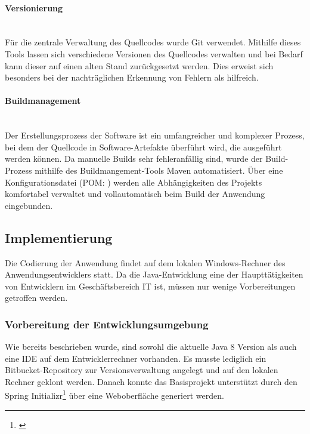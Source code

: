 \paragraph{Versionierung} ~\\
\label{p:Versionierung}
Für die zentrale Verwaltung des Quellcodes wurde Git verwendet. Mithilfe dieses Tools lassen sich verschiedene Versionen des Quellcodes verwalten und bei Bedarf kann dieser auf einen alten Stand zurückgesetzt werden. Dies erweist sich besonders bei der nachträglichen Erkennung von Fehlern als hilfreich.

\paragraph{Buildmanagement} ~\\
\label{p:Buildmangement}
Der Erstellungsprozess der Software ist ein umfangreicher und komplexer Prozess, bei dem der Quellcode in Software-Artefakte überführt wird, die ausgeführt werden können. Da manuelle Builds sehr fehleranfällig sind, wurde der Build-Prozess mithilfe des Buildmangement-Tools Maven automatisiert. Über eine Konfigurationsdatei (\acs{POM}: ) werden alle Abhängigkeiten des Projekts komfortabel verwaltet und vollautomatisch beim Build der Anwendung eingebunden.


\subsection{Implementierung} 
\label{sec:Implementierung}
Die Codierung der Anwendung findet auf dem lokalen Windows-Rechner des Anwendungsentwicklers statt. Da die Java-Entwicklung eine der Haupttätigkeiten von Entwicklern im Geschäftsbereich IT ist, müssen nur wenige Vorbereitungen getroffen werden.

\subsubsection{Vorbereitung der Entwicklungsumgebung}
\label{sec:Entwicklungsumgebung}
Wie bereits beschrieben wurde, sind sowohl die aktuelle Java 8 Version als auch eine \ac{IDE} auf dem Entwicklerrechner vorhanden. Es musste lediglich ein Bitbucket-Repository zur Versionsverwaltung angelegt und auf den lokalen Rechner geklont werden. Danach konnte das Basisprojekt unterstützt durch den Spring Initializr\footnote{\cite{spring:init}} über eine Weboberfläche generiert werden.


